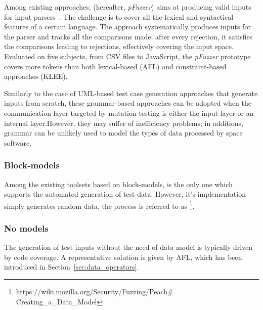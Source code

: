 %
%



Among existing approaches,  (hereafter, \emph{pFuzzer}) aims at producing valid inputs for input parsers~\cite{mathis2019parser}. The challenge is to cover all the lexical and syntactical features of a certain language. The approach systematically produces inputs for the parser and tracks all the comparisons made; after every rejection, it satisfies the comparisons leading to rejections, effectively covering the input space. 
Evaluated on five subjects, from CSV files to JavaScript, the \emph{pFuzzer} prototype covers more tokens than both lexical-based (AFL) and constraint-based approaches (KLEE).


Similarly to the case of UML-based test case generation approaches that generate inputs from scratch, these grammar-based approaches can be adopted when the communication layer targeted by mutation testing is either the input layer or an internal layer.However, they may suffer of inefficiency problems; in additions, grammar can be unlikely used to model the types of data processed by space software.


\subsubsection{Block-models}

Among the existing toolsets based on block-models,  is the only one which supports the automated generation of test data. However, it's implementation simply generates random data, the process is referred to as 
\footnote{https://wiki.mozilla.org/Security/Fuzzing/Peach$\#$Creating\_a\_Data\_Model}.


\subsubsection{No models}


The generation of test inputs without the need of data model is typically driven by code coverage. A representative solution is given by AFL, which has been introduced in Section~\ref{sec:data_operators}. 

